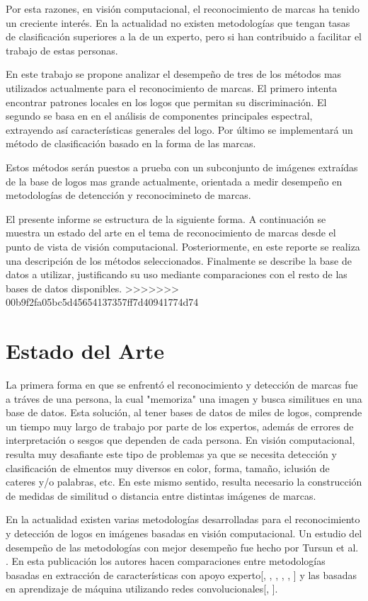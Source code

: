 \documentclass[conference]{IEEEtran}
\begin{document}
Por esta razones, en visión computacional, el reconocimiento de marcas ha tenido un creciente interés. En la actualidad no existen metodologías que tengan tasas de clasificación superiores a la de un experto, pero si han contribuido a facilitar el trabajo de estas personas.

En este trabajo se propone analizar el desempeño de tres de los métodos mas utilizados actualmente para el reconocimiento de marcas. El primero intenta encontrar patrones locales en los logos que permitan su discriminación. El segundo se basa en en el análisis de componentes principales espectral, extrayendo así características generales del logo. Por último se implementará un método de clasificación basado en la forma de las marcas.

Estos métodos serán puestos a prueba con un subconjunto de imágenes extraídas de la base de logos mas grande actualmente, orientada a medir desempeño en metodologías de detencción y reconocimineto de marcas.

El presente informe se estructura de la siguiente forma. A continuación se muestra un estado del arte en el tema de reconocimiento de marcas desde el punto de vista de visión computacional. Posteriormente, en este reporte se realiza una descripción de los métodos seleccionados. Finalmente se describe la base de datos a utilizar, justificando su uso mediante comparaciones con el resto de las bases de datos disponibles.
>>>>>>> 00b9f2fa05bc5d45654137357ff7d40941774d74


\section{Estado del Arte}
La primera forma en que se enfrentó el reconocimiento y detección de marcas fue a tráves de una persona, la cual "memoriza" una imagen y busca similitues en una base de datos. Esta solución, al tener bases de datos de miles de logos, comprende un tiempo muy largo de trabajo por parte de los expertos, además de errores de interpretación o sesgos que dependen de cada persona.
En visión computacional, resulta muy desafiante este tipo de problemas ya que se necesita detección y clasificación de elmentos muy diversos en color, forma, tamaño, iclusión de cateres y/o palabras, etc. En este mismo sentido, resulta necesario la construcción de medidas de similitud o distancia entre distintas imágenes de marcas.

En la actualidad existen varias metodologías desarrolladas para el reconocimiento y detección de logos en imágenes basadas en visión computacional. Un estudio del desempeño de las metodologías con mejor desempeño fue hecho por Tursun et al. \cite{metuV2}. En esta publicación los autores hacen comparaciones entre metodologías basadas en extracción de características con apoyo experto[\cite{bowd}, \cite{colorHist}, \cite{GIST}, \cite{kpoint}, \cite{LBP}, \cite{shape}] y las basadas en aprendizaje de máquina utilizando redes convolucionales[\cite{cnn1}, \cite{cnn2}]. 
\end{document}

